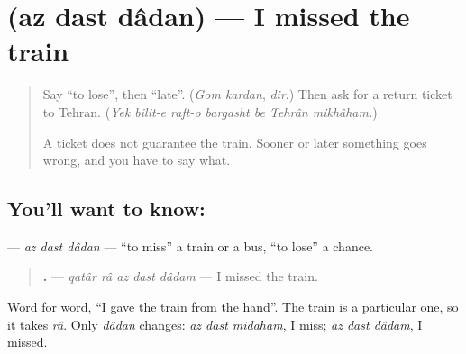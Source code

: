 \section[\texorpdfstring{\fa{از} \fa{دست} \fa{دادن} (az dast dâdan)}{از دست دادن (az dast dâdan)}]{   (az dast dâdan) — I missed the train}

\label{lesson:FA-C295-az-dast-dadan}



\begin{quote}
Say \textquotedblleft{}to lose\textquotedblright{}, then \textquotedblleft{}late\textquotedblright{}. (\emph{Gom kardan}, \emph{dir}.) Then ask for a return ticket to Tehran. (\emph{Yek bilit-e raft-o bargasht be Tehrân mikhâham.})

A ticket does not guarantee the train. Sooner or later something goes wrong, and you have to say what.
\end{quote}

\subsection*{You'll want to know:   }
\textbf{  } — \emph{az dast dâdan} — \textquotedblleft{}to miss\textquotedblright{} a train or a bus, \textquotedblleft{}to lose\textquotedblright{} a chance.

\begin{quote}
\textbf{    .} — \emph{qatâr râ az dast dâdam} — I missed the train.
\end{quote}

Word for word, \textquotedblleft{}I gave the train from the hand\textquotedblright{}. The train is a particular one, so it takes \emph{râ}. Only \emph{dâdan} changes: \emph{az dast midaham}, I miss; \emph{az dast dâdam}, I missed.

